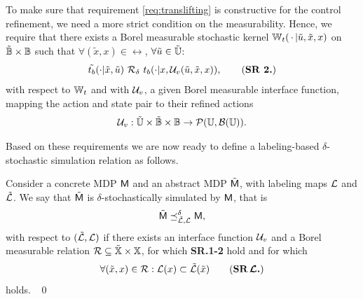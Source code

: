 \documentclass{ifacconf}
\begin{document}
To make sure that requirement \eqref{req:translifting} is constructive for the control refinement, we need a more strict condition on the measurability.  Hence, we require that 
  there exists a Borel measurable stochastic kernel $\mathbb{W}_{t}(\,\cdot\,{\mid} \tilde u,\tilde x,x)$ on $\tilde {\mathbb{B}}\times\mathbb{B}$ such that $\forall (\tilde x,x)\in \rel$, $\forall \tilde u\in\tilde {{\mathbb{U}}}$:
\begin{equation}\tilde \trb(\cdot| \tilde x, \tilde u)\ \bar \rel_\delta \  \trb(\cdot| x, \InF(\tilde u,\tilde x,x)),\tag{\textbf{SR 2.}}\end{equation} with respect to $\mathbb{W}_{t}$ and with $\mathcal{U}_{v}$, a given Borel measurable  interface function, mapping the action and state pair to their refined actions
\begin{align*}\mathcal{U}_{v}: \tilde {{\mathbb{U}}}\times \tilde {\mathbb{B}}\times\mathbb{B} \rightarrow \mathcal{P}({\mathbb{U}},\mathcal B({\mathbb{U}})). \end{align*}

Based on these requirements we are now ready to define a labeling-based $\delta$-stochastic simulation relation as follows. 

\begin{definition}\label{def:apbsim}
Consider a concrete MDP $\mathsf{M}$ and an abstract  MDP $\tilde{\mathsf{M}}$, with labeling maps $\mathcal{L}$ and  $\tilde{\mathcal{L}}$.   
We say that	$\tilde{\mathsf{M}}$ is $\delta$-stochastically simulated by $\mathsf{M}$, that is $$\tilde{\mathsf{M}}\preceq^{\delta}_{\tilde{\mathcal{L}},\mathcal{L}}\mathsf{M},$$ with respect to $(\tilde{\mathcal{L}},\mathcal{L})$  if there exists an interface function $\mathcal{U}_{v}$ and
	a Borel measurable relation $\mathcal{R}\subseteq \tilde {{\mathbb{X}}}\times {\mathbb{X}}$, for which \textbf{SR.1-2} hold and for which 	\begin{equation}
	  \forall (\tilde x,x)\in \rel:  \Labset(x)\subset \tilde{\Labset}(\tilde x)
\tag{\textbf{SR$\,\boldsymbol{\CA{L}}$.}}
	\end{equation} 
holds. \hfill\mbox{ }\qed
\end{definition}
\end{document}
